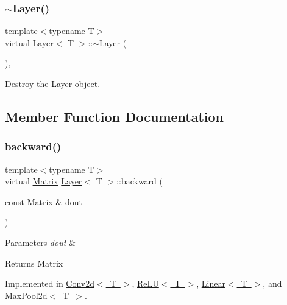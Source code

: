 \subsubsection{\texorpdfstring{$\sim$Layer()}{~Layer()}}
{\footnotesize\ttfamily template$<$typename T$>$ \\
virtual \mbox{\hyperlink{class_layer}{Layer}}$<$ T $>$\+::$\sim$\mbox{\hyperlink{class_layer}{Layer}} (\begin{DoxyParamCaption}{ }\end{DoxyParamCaption})\hspace{0.3cm}{\ttfamily [virtual]}, {\ttfamily [default]}}



Destroy the \mbox{\hyperlink{class_layer}{Layer}} object. 



\subsection{Member Function Documentation}
\mbox{\label{class_layer_ac4c13a3a85bfdd4d7d4d18669e3299fe}} 
\subsubsection{\texorpdfstring{backward()}{backward()}}
{\footnotesize\ttfamily template$<$typename T$>$ \\
virtual \mbox{\hyperlink{class_layer_a22b1e7286096aa62bd245536c8ebdaf1}{Matrix}} \mbox{\hyperlink{class_layer}{Layer}}$<$ T $>$\+::backward (\begin{DoxyParamCaption}\item[{const \mbox{\hyperlink{class_layer_a22b1e7286096aa62bd245536c8ebdaf1}{Matrix}} \&}]{dout }\end{DoxyParamCaption})\hspace{0.3cm}{\ttfamily [pure virtual]}}


\begin{DoxyParams}{Parameters}
{\em dout} & \\
\hline
\end{DoxyParams}
\begin{DoxyReturn}{Returns}
Matrix 
\end{DoxyReturn}


Implemented in \mbox{\hyperlink{class_conv2d_ab5a54c023efbc6206b8f4aa355e5faa9}{Conv2d$<$ T $>$}}, \mbox{\hyperlink{class_re_l_u_aa634f43909614b979d84f5d4e5480bb4}{Re\+L\+U$<$ T $>$}}, \mbox{\hyperlink{class_linear_a747db1996e723fae7c9713d4b7f303af}{Linear$<$ T $>$}}, and \mbox{\hyperlink{class_max_pool2d_a05cc96411753ff4c0c79a1543af9e795}{Max\+Pool2d$<$ T $>$}}.

